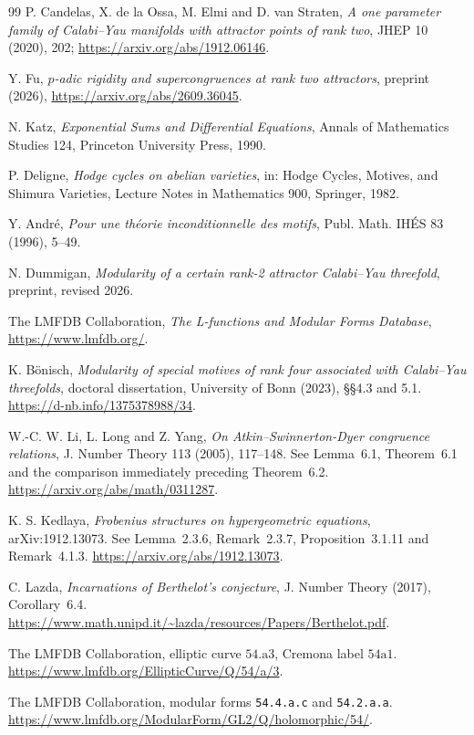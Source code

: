 \documentclass[11pt,letterpaper]{article}
\theoremstyle{definition}
\theoremstyle{remark}
\begin{document}
\begin{thebibliography}{99}
P. Candelas, X. de la Ossa, M. Elmi and D. van Straten,
\emph{A one parameter family of Calabi--Yau manifolds with attractor points of rank two},
JHEP 10 (2020), 202;
\url{https://arxiv.org/abs/1912.06146}.

Y. Fu,
\emph{$p$-adic rigidity and supercongruences at rank two attractors},
preprint (2026), \url{https://arxiv.org/abs/2609.36045}.

N. Katz,
\emph{Exponential Sums and Differential Equations},
Annals of Mathematics Studies 124, Princeton University Press, 1990.

P. Deligne,
\emph{Hodge cycles on abelian varieties},
in: Hodge Cycles, Motives, and Shimura Varieties,
Lecture Notes in Mathematics 900, Springer, 1982.

Y. Andr\'e,
\emph{Pour une th\'eorie inconditionnelle des motifs},
Publ. Math. IH\'ES 83 (1996), 5--49.

N. Dummigan,
\emph{Modularity of a certain rank-2 attractor Calabi--Yau threefold},
preprint, revised 2026.

The LMFDB Collaboration,
\emph{The L-functions and Modular Forms Database},
\url{https://www.lmfdb.org/}.

K. B\"onisch, \emph{Modularity of special motives of
rank four associated with Calabi--Yau threefolds}, doctoral
dissertation, University of Bonn (2023), \S\S4.3 and 5.1.
\url{https://d-nb.info/1375378988/34}.

W.-C. W. Li, L. Long and Z. Yang, \emph{On
Atkin--Swinnerton-Dyer congruence relations}, J. Number Theory
113 (2005), 117--148. See Lemma~6.1, Theorem~6.1 and the comparison
immediately preceding Theorem~6.2. \url{https://arxiv.org/abs/math/0311287}.

K. S. Kedlaya, \emph{Frobenius structures on
hypergeometric equations}, arXiv:1912.13073. See Lemma~2.3.6,
Remark~2.3.7, Proposition~3.1.11 and Remark~4.1.3.
\url{https://arxiv.org/abs/1912.13073}.

C. Lazda, \emph{Incarnations of Berthelot's conjecture},
J. Number Theory (2017), Corollary~6.4.
\url{https://www.math.unipd.it/~lazda/resources/Papers/Berthelot.pdf}.

The LMFDB Collaboration, elliptic curve $54.\mathrm{a}3$,
Cremona label $54\mathrm{a}1$.
\url{https://www.lmfdb.org/EllipticCurve/Q/54/a/3}.

The LMFDB Collaboration, modular forms
\texttt{54.4.a.c} and \texttt{54.2.a.a}.
\url{https://www.lmfdb.org/ModularForm/GL2/Q/holomorphic/54/}.
\end{thebibliography}
\end{document}
